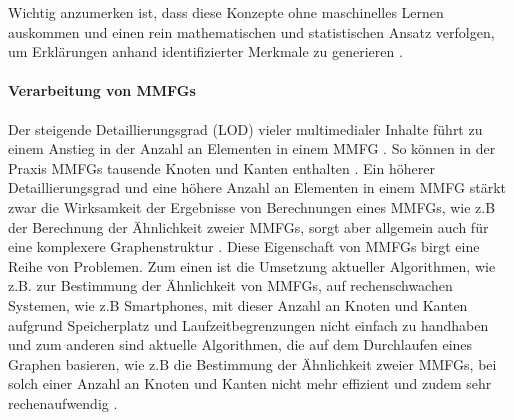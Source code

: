 Wichtig anzumerken ist, dass diese Konzepte ohne maschinelles Lernen auskommen und einen rein mathematischen und statistischen Ansatz verfolgen, um Erklärungen anhand identifizierter Merkmale zu generieren \cite{towards_auto_sem_expl_mmfg}.

\paragraph{Verarbeitung von MMFGs}
\label{sec2:sota:par:processing-of-mmfgs}
Der steigende Detaillierungsgrad (LOD) vieler multimedialer Inhalte führt zu einem Anstieg in der Anzahl an Elementen in einem MMFG \cite{exp-mmfg}.
So können in der Praxis MMFGs tausende Knoten und Kanten enthalten \cite{ai-based-sem-ind-retr-soc}.
Ein höherer Detaillierungsgrad und eine höhere Anzahl an Elementen in einem MMFG stärkt zwar die Wirksamkeit der Ergebnisse von Berechnungen eines MMFGs, wie z.B der Berechnung der Ähnlichkeit zweier MMFGs, sorgt aber allgemein auch für eine komplexere Graphenstruktur \cite{fast-effec-retr-large-collec}.
Diese Eigenschaft von MMFGs birgt eine Reihe von Problemen.
Zum einen ist die Umsetzung aktueller Algorithmen, wie z.B. zur Bestimmung der Ähnlichkeit von MMFGs, auf rechenschwachen Systemen, wie z.B Smartphones, mit dieser Anzahl an Knoten und Kanten aufgrund Speicherplatz und Laufzeitbegrenzungen nicht einfach zu handhaben und zum anderen sind aktuelle Algorithmen, die auf dem Durchlaufen eines Graphen basieren, wie z.B die Bestimmung der Ähnlichkeit zweier MMFGs, bei solch einer Anzahl an Knoten und Kanten nicht mehr effizient und zudem sehr rechenaufwendig \cite{fast-effec-retr-large-collec}.

